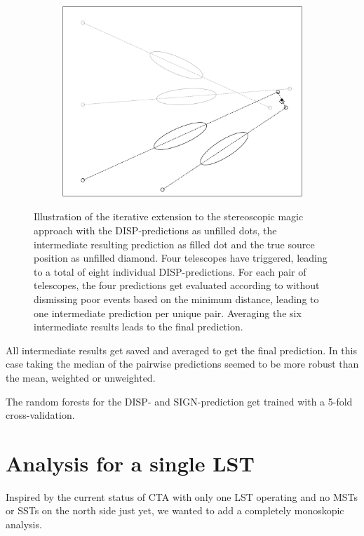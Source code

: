 \begin{figure}
\begin{subfigure}{0.45\textwidth}
        \includegraphics[width=\linewidth]{Plots/stereo_magic_6.pdf} 
    \end{subfigure}
    \caption{
    Illustration of the iterative extension to the stereoscopic magic approach
    with the DISP-predictions as unfilled dots, the intermediate resulting prediction
    as filled dot and the true source position as unfilled diamond.
    Four telescopes have triggered, leading to a total of eight individual DISP-predictions.
    For each pair of telescopes, the four predictions get evaluated according to \cite{ALEKSIC201676}
    without dismissing poor events based on the minimum distance, leading to one 
    intermediate prediction per unique pair.
    Averaging the six intermediate results leads to the final prediction.}
    \label{fig:stereo_disp}
\end{figure}

All intermediate results get saved and averaged to get the final prediction.
In this case taking the median of the pairwise predictions seemed to be more robust
than the mean, weighted or unweighted.

The random forests for the DISP- and SIGN-prediction get trained with a 5-fold cross-validation.

\iffalse
\section{Analysis for a single LST}
Inspired by the current status of CTA with only one LST operating and no MSTs or SSTs
on the north side just yet,
we wanted to add a completely monoskopic analysis.

